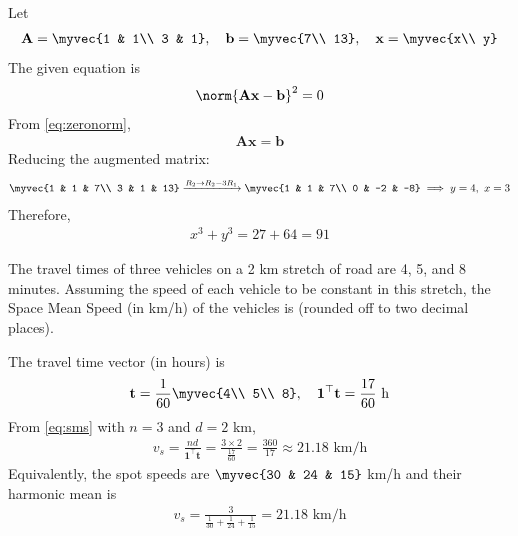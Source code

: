 \begin{enumerate}[label=1.2.\arabic*,leftmargin=*,labelsep=0.8em,itemsep=2ex]
\solution Let
\begin{align}
\mathbf{A} = \myvec{1 & 1\\ 3 & 1},\quad \mathbf{b} = \myvec{7\\ 13},\quad \mathbf{x} = \myvec{x\\ y}
\end{align}
The given equation is
\begin{align}
\norm{\mathbf{A}\mathbf{x} - \mathbf{b}}^2 = 0
\end{align}
From \eqref{eq:zeronorm},
\begin{align}
\mathbf{A}\mathbf{x} = \mathbf{b}
\end{align}
Reducing the augmented matrix:
\begin{align}
\myvec{1 & 1 & 7\\ 3 & 1 & 13} \xrightarrow{R_2\to R_2 - 3R_1} \myvec{1 & 1 & 7\\ 0 & -2 & -8} \implies y = 4,\ x = 3
\end{align}
Therefore,
\begin{align}
x^3 + y^3 = 27 + 64 = 91
\end{align}

\problem The travel times of three vehicles on a 2 km stretch of road are 4, 5, and 8 minutes. Assuming the speed of each vehicle to be constant in this stretch, the Space Mean Speed (in km/h) of the vehicles is \underline{\hspace{2cm}} (rounded off to two decimal places). \gate

\solution The travel time vector (in hours) is
\begin{align}
\mathbf{t} = \frac{1}{60}\myvec{4\\ 5\\ 8},\quad \mathbf{1}^\top\mathbf{t} = \frac{17}{60}\text{ h}
\end{align}
From \eqref{eq:sms} with $n = 3$ and $d = 2$ km,
\begin{align}
v_s = \frac{nd}{\mathbf{1}^\top\mathbf{t}} = \frac{3\times 2}{\frac{17}{60}} = \frac{360}{17} \approx 21.18\text{ km/h}
\end{align}
Equivalently, the spot speeds are $\myvec{30 & 24 & 15}$ km/h and their harmonic mean is
\begin{align}
v_s = \frac{3}{\frac{1}{30} + \frac{1}{24} + \frac{1}{15}} = 21.18\text{ km/h}
\end{align}


\end{enumerate}
